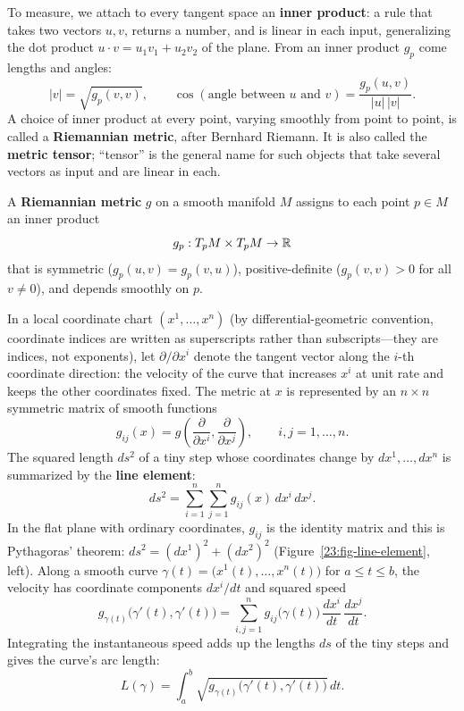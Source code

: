 To measure, we attach to every tangent space an \textbf{inner product}: a rule that takes two vectors $u, v$, returns a number, and is linear in each input, generalizing the dot product $u \cdot v = u_1 v_1 + u_2 v_2$ of the plane. From an inner product $g_p$ come lengths and angles:
\[
|v| = \sqrt{g_p(v, v)}, \qquad \cos(\text{angle between } u \text{ and } v) = \frac{g_p(u, v)}{|u|\,|v|}.
\]
A choice of inner product at every point, varying smoothly from point to point, is called a \textbf{Riemannian metric}, after Bernhard Riemann. It is also called the \textbf{metric tensor}; ``tensor'' is the general name for such objects that take several vectors as input and are linear in each.
\begin{definition}
A \textbf{Riemannian metric} $g$ on a smooth manifold $M$ assigns to each point $p \in M$ an inner product
\[
g_p : T_p M \times T_p M \to \mathbb{R}
\]
that is symmetric ($g_p(u, v) = g_p(v, u)$), positive-definite ($g_p(v, v) > 0$ for all $v \neq 0$), and depends smoothly on $p$.
\end{definition}

In a local coordinate chart $(x^1, \dots, x^n)$ (by differential-geometric convention, coordinate indices are written as superscripts rather than subscripts---they are indices, not exponents), let $\partial/\partial x^i$ denote the tangent vector along the $i$-th coordinate direction: the velocity of the curve that increases $x^i$ at unit rate and keeps the other coordinates fixed. The metric at $x$ is represented by an $n \times n$ symmetric matrix of smooth functions
\[
g_{ij}(x) = g\left(\frac{\partial}{\partial x^i}, \frac{\partial}{\partial x^j}\right), \qquad i, j = 1, \dots, n.
\]
The squared length $ds^2$ of a tiny step whose coordinates change by $dx^1, \dots, dx^n$ is summarized by the \textbf{line element}:
\[
ds^2 = \sum_{i=1}^n \sum_{j=1}^n g_{ij}(x) \, dx^i \, dx^j.
\]
In the flat plane with ordinary coordinates, $g_{ij}$ is the identity matrix and this is Pythagoras' theorem: $ds^2 = (dx^1)^2 + (dx^2)^2$ (Figure~\ref{23:fig-line-element}, left).
Along a smooth curve $\gamma(t) = \bigl(x^1(t), \dots, x^n(t)\bigr)$ for $a \le t \le b$, the velocity has coordinate components $dx^i/dt$ and squared speed
\[
g_{\gamma(t)}\bigl(\gamma'(t), \gamma'(t)\bigr) = \sum_{i,j=1}^n g_{ij}\bigl(\gamma(t)\bigr) \, \frac{dx^i}{dt} \, \frac{dx^j}{dt}.
\]
Integrating the instantaneous speed adds up the lengths $ds$ of the tiny steps and gives the curve's arc length:
\[
L(\gamma) = \int_a^b \sqrt{g_{\gamma(t)}\bigl(\gamma'(t), \gamma'(t)\bigr)} \, dt.
\]

